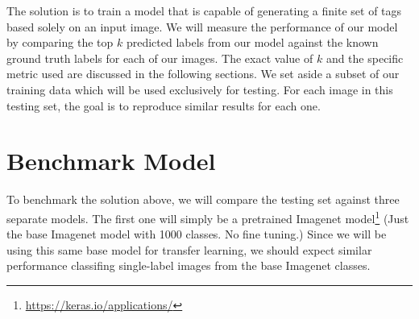 \documentclass[10pt, a4paper, twocolumn]{article} %
\begin{document}


The solution is to train a model that is capable of generating a finite set of tags based solely on an input image.  We will measure the performance of our model by comparing the top $k$ predicted labels from our model against the known ground truth labels for each of our images.  The exact value of $k$ and the specific metric used are discussed in the following sections. We set aside a subset of our training data which will be used exclusively for testing. For each image in this testing set, the goal is to reproduce similar results for each one.

\section{Benchmark Model} %


To benchmark the solution above, we will compare the testing set against three separate models.  The first one will simply be a pretrained Imagenet model\footnote{\url{https://keras.io/applications/}} (Just the base Imagenet model with 1000 classes. No fine tuning.) Since we will be using this same base model for transfer learning, we should expect similar performance classifing single-label images from the base Imagenet classes.  
\end{document}
